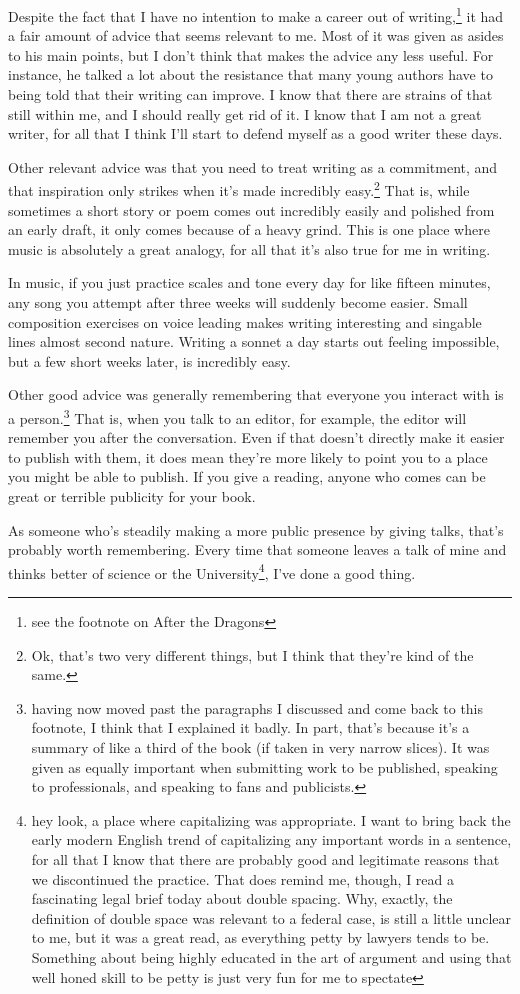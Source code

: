 \documentclass[12pt]{article}[titlepage]
\newcommand{\1}{\={a}}
\newcommand{\2}{\={e}}
\newcommand{\3}{\={\i}}
\newcommand{\4}{\=o}
\newcommand{\5}{\=u}
\newcommand{\6}{\={A}}
\renewcommand{\,}{\textsuperscript{,}}
\begin{document}
Despite the fact that I have no intention to make a career out of writing,\footnote{see the footnote on After the Dragons} it had a fair amount of advice that seems relevant to me.
Most of it was given as asides to his main points, but I don't think that makes the advice any less useful.
For instance, he talked a lot about the resistance that many young authors have to being told that their writing can improve.
I know that there are strains of that still within me, and I should really get rid of it.
I know that I am not a great writer, for all that I think I'll start to defend myself as a good writer these days.

Other relevant advice was that you need to treat writing as a commitment, and that inspiration only strikes when it's made incredibly easy.\footnote{Ok, that's two very different things, but I think that they're kind of the same.}
That is, while sometimes a short story or poem comes out incredibly easily and polished from an early draft, it only comes because of a heavy grind.
This is one place where music is absolutely a great analogy, for all that it's also true for me in writing.

In music, if you just practice scales and tone every day for like fifteen minutes, any song you attempt after three weeks will suddenly become easier.
Small composition exercises on voice leading makes writing interesting and singable lines almost second nature.
Writing a sonnet a day starts out feeling impossible, but a few short weeks later, is incredibly easy.

Other good advice was generally remembering that everyone you interact with is a person.\footnote{having now moved past the paragraphs I discussed and come back to this footnote, I think that I explained it badly.
In part, that's because it's a summary of like a third of the book (if taken in very narrow slices).
It was given as equally important when submitting work to be published, speaking to professionals, and speaking to fans and publicists.}
That is, when you talk to an editor, for example, the editor will remember you after the conversation.
Even if that doesn't directly make it easier to publish with them, it does mean they're more likely to point you to a place you might be able to publish.
If you give a reading, anyone who comes can be great or terrible publicity for your book.

As someone who's steadily making a more public presence by giving talks, that's probably worth remembering.
Every time that someone leaves a talk of mine and thinks better of science or the University\footnote{hey look, a place where capitalizing was appropriate.
I want to bring back the early modern English trend of capitalizing any important words in a sentence, for all that I know that there are probably good and legitimate reasons that we discontinued the practice.
That does remind me, though, I read a fascinating legal brief today about double spacing.
Why, exactly, the definition of double space was relevant to a federal case, is still a little unclear to me, but it was a great read, as everything petty by lawyers tends to be.
Something about being highly educated in the art of argument and using that well honed skill to be petty is just very fun for me to spectate}, I've done a good thing.
\end{document}
